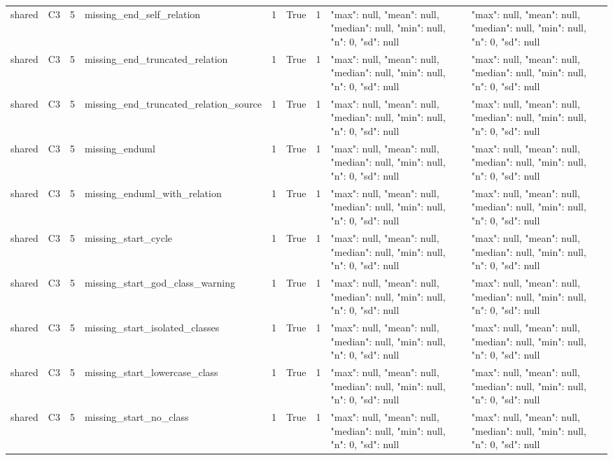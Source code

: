 \begin{tabular}{lllllllll}
shared & C3 & 5 & missing\_end\_self\_relation & 1 & True & 1 & {"max": null, "mean": null, "median": null, "min": null, "n": 0, "sd": null} & {"max": null, "mean": null, "median": null, "min": null, "n": 0, "sd": null} \\
shared & C3 & 5 & missing\_end\_truncated\_relation & 1 & True & 1 & {"max": null, "mean": null, "median": null, "min": null, "n": 0, "sd": null} & {"max": null, "mean": null, "median": null, "min": null, "n": 0, "sd": null} \\
shared & C3 & 5 & missing\_end\_truncated\_relation\_source & 1 & True & 1 & {"max": null, "mean": null, "median": null, "min": null, "n": 0, "sd": null} & {"max": null, "mean": null, "median": null, "min": null, "n": 0, "sd": null} \\
shared & C3 & 5 & missing\_enduml & 1 & True & 1 & {"max": null, "mean": null, "median": null, "min": null, "n": 0, "sd": null} & {"max": null, "mean": null, "median": null, "min": null, "n": 0, "sd": null} \\
shared & C3 & 5 & missing\_enduml\_with\_relation & 1 & True & 1 & {"max": null, "mean": null, "median": null, "min": null, "n": 0, "sd": null} & {"max": null, "mean": null, "median": null, "min": null, "n": 0, "sd": null} \\
shared & C3 & 5 & missing\_start\_cycle & 1 & True & 1 & {"max": null, "mean": null, "median": null, "min": null, "n": 0, "sd": null} & {"max": null, "mean": null, "median": null, "min": null, "n": 0, "sd": null} \\
shared & C3 & 5 & missing\_start\_god\_class\_warning & 1 & True & 1 & {"max": null, "mean": null, "median": null, "min": null, "n": 0, "sd": null} & {"max": null, "mean": null, "median": null, "min": null, "n": 0, "sd": null} \\
shared & C3 & 5 & missing\_start\_isolated\_classes & 1 & True & 1 & {"max": null, "mean": null, "median": null, "min": null, "n": 0, "sd": null} & {"max": null, "mean": null, "median": null, "min": null, "n": 0, "sd": null} \\
shared & C3 & 5 & missing\_start\_lowercase\_class & 1 & True & 1 & {"max": null, "mean": null, "median": null, "min": null, "n": 0, "sd": null} & {"max": null, "mean": null, "median": null, "min": null, "n": 0, "sd": null} \\
shared & C3 & 5 & missing\_start\_no\_class & 1 & True & 1 & {"max": null, "mean": null, "median": null, "min": null, "n": 0, "sd": null} & {"max": null, "mean": null, "median": null, "min": null, "n": 0, "sd": null} \\

\end{tabular}
